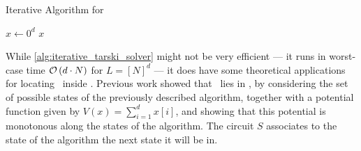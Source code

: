 \begin{algorithm}
    \caption{Iterative Algorithm for \Tarski}
    \label{alg:iterative_tarski_solver}
    $x \leftarrow 0^d$ \;
    \Return $x$ \;
\end{algorithm}

While \cref{alg:iterative_tarski_solver} might not be very efficient --- it runs in worst-case time $\mathcal{O}\left(d \cdot N\right)$ for $L = [N]^d$ --- it does have some theoretical applications for locating \Tarski\ inside \TFNP. Previous work  showed that \Tarski\ lies in \PLS, by considering the set of possible states of the previously described algorithm, together with a potential function given by $V(x) = \sum_{i=1}^{d}{x[i]}$, and showing that this potential is monotonous along the states of the algorithm. The circuit $S$ associates to the state of the algorithm the next state it will be in.

